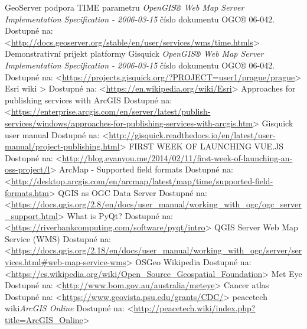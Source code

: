 \documentclass[12pt,a4paper]{article}
\begin{document}
\begin{thebibliography}{99}
GeoServer podpora TIME parametru \textit{OpenGIS® Web Map Server Implementation Specification - 2006-03-15} číslo dokumentu OGC® 06-042.
Dostupné na: \textless\url{http://docs.geoserver.org/stable/en/user/services/wms/time.htmls}\textgreater
{}
Demonstrativní prijekt platformy Gisquick \textit{OpenGIS® Web Map Server Implementation Specification - 2006-03-15} číslo dokumentu OGC® 06-042.
Dostupné na: \textless\url{https://projects.gisquick.org/?PROJECT=user1/prague/prague}\textgreater
{}
Esri wiki \textit{}\textgreater
Dostupné na: \textless\url{https://en.wikipedia.org/wiki/Esri}\textgreater
{}
Approaches for publishing services with ArcGIS \textit{}
Dostupné na: \textless\url{https://enterprise.arcgis.com/en/server/latest/publish-services/windows/approaches-for-publishing-services-with-arcgis.htm}\textgreater
{}
Gisquick user manual \textit{}
Dostupné na: \textless\url{http://gisquick.readthedocs.io/en/latest/user-manual/project-publishing.html}\textgreater
{}
FIRST WEEK OF LAUNCHING VUE.JS \textit{}
Dostupné na: \textless\url{http://blog.evanyou.me/2014/02/11/first-week-of-launching-an-oss-project/l}\textgreater
{}
ArcMap - Supported field formats \textit{}
Dostupné na: \textless\url{http://desktop.arcgis.com/en/arcmap/latest/map/time/supported-field-formats.htm}\textgreater
{}
QGIS as OGC Data Server\textit{}
Dostupné na: \textless\url{https://docs.qgis.org/2.8/en/docs/user_manual/working_with_ogc/ogc_server_support.html}\textgreater
{}
What is PyQt?\textit{}
Dostupné na: \textless\url{https://riverbankcomputing.com/software/pyqt/intro}\textgreater
{}
QGIS Server Web Map Service (WMS)\textit{}
Dostupné na: \textless\url{https://docs.qgis.org/2.18/en/docs/user_manual/working_with_ogc/server/services.html#web-map-service-wms}\textgreater
{}
OSGeo Wikipedia\textit{}
Dostupné na: \textless\url{https://cs.wikipedia.org/wiki/Open_Source_Geospatial_Foundation}\textgreater
{}
Met Eye\textit{}
Dostupné na: \textless\url{http://www.bom.gov.au/australia/meteye}\textgreater
{}
Cancer atlas\textit{}
Dostupné na: \textless\url{https://www.geovista.psu.edu/grants/CDC/}\textgreater
{}
peacetech wiki\textit{ArcGIS Online}
Dostupné na: \textless\url{http://peacetech.wiki/index.php?title=ArcGIS_Online}\textgreater
\end{thebibliography}
\end{document}
